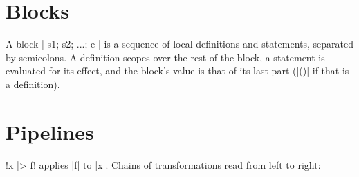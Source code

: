 
\section{Blocks}
A block \fc|{ s1; s2; ...; e }| is a sequence of local definitions and
statements, separated by semicolons. A definition scopes over the rest of
the block, a statement is evaluated for its effect, and the block's value is
that of its last part (\fc|()| if that is a definition).


\section{Pipelines}
\fc!x |> f! applies \fc|f| to \fc|x|. Chains of transformations read from
left to right:

